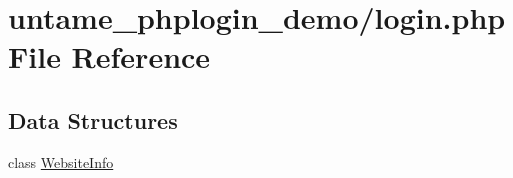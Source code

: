 \hypertarget{login_8php}{}\section{untame\+\_\+phplogin\+\_\+demo/login.php File Reference}
\label{login_8php}
\subsection*{Data Structures}
\begin{DoxyCompactItemize}
\item 
class \hyperlink{class_website_info}{Website\+Info}
\end{DoxyCompactItemize}
